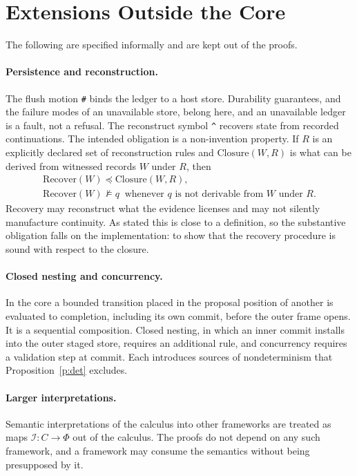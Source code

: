 \documentclass[11pt]{article}
\newcommand{\code}[1]{\texttt{#1}}
\begin{document}
\section{Extensions Outside the Core}

The following are specified informally and are kept out of the proofs.

\paragraph{Persistence and reconstruction.} The flush motion \code{\#} binds the ledger to a host store. Durability guarantees, and the failure modes of an unavailable store, belong here, and an unavailable ledger is a fault, not a refusal. The reconstruct symbol \code{\^{}} recovers state from recorded continuations. The intended obligation is a non-invention property. If $R$ is an explicitly declared set of reconstruction rules and $\mathrm{Closure}(W,R)$ is what can be derived from witnessed records $W$ under $R$, then
\begin{gather*}
\mathrm{Recover}(W)\preceq\mathrm{Closure}(W,R),\\
\mathrm{Recover}(W)\not\models q\ \text{ whenever } q\text{ is not derivable from }W\text{ under }R.
\end{gather*}
Recovery may reconstruct what the evidence licenses and may not silently manufacture continuity. As stated this is close to a definition, so the substantive obligation falls on the implementation: to show that the recovery procedure is sound with respect to the closure.

\paragraph{Closed nesting and concurrency.} In the core a bounded transition placed in the proposal position of another is evaluated to completion, including its own commit, before the outer frame opens. It is a sequential composition. Closed nesting, in which an inner commit installs into the outer staged store, requires an additional rule, and concurrency requires a validation step at commit. Each introduces sources of nondeterminism that Proposition~\ref{p:det} excludes.

\paragraph{Larger interpretations.} Semantic interpretations of the calculus into other frameworks are treated as maps $\mathcal I:C\to\Phi$ out of the calculus. The proofs do not depend on any such framework, and a framework may consume the semantics without being presupposed by it.
\end{document}
